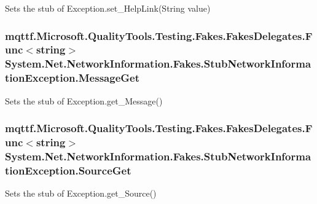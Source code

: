 Sets the stub of Exception.\-set\-\_\-\-Help\-Link(\-String value)

\hypertarget{class_system_1_1_net_1_1_network_information_1_1_fakes_1_1_stub_network_information_exception_aaf7dc3b65d0c5509c483018c73f2d968}{
\subsubsection[{Message\-Get}]{\setlength{\rightskip}{0pt plus 5cm}mqttf.\-Microsoft.\-Quality\-Tools.\-Testing.\-Fakes.\-Fakes\-Delegates.\-Func$<$string$>$ System.\-Net.\-Network\-Information.\-Fakes.\-Stub\-Network\-Information\-Exception.\-Message\-Get}}\label{class_system_1_1_net_1_1_network_information_1_1_fakes_1_1_stub_network_information_exception_aaf7dc3b65d0c5509c483018c73f2d968}


Sets the stub of Exception.\-get\-\_\-\-Message()

\hypertarget{class_system_1_1_net_1_1_network_information_1_1_fakes_1_1_stub_network_information_exception_a081912a58a827245f965950980deafe2}{
\subsubsection[{Source\-Get}]{\setlength{\rightskip}{0pt plus 5cm}mqttf.\-Microsoft.\-Quality\-Tools.\-Testing.\-Fakes.\-Fakes\-Delegates.\-Func$<$string$>$ System.\-Net.\-Network\-Information.\-Fakes.\-Stub\-Network\-Information\-Exception.\-Source\-Get}}\label{class_system_1_1_net_1_1_network_information_1_1_fakes_1_1_stub_network_information_exception_a081912a58a827245f965950980deafe2}


Sets the stub of Exception.\-get\-\_\-\-Source()

